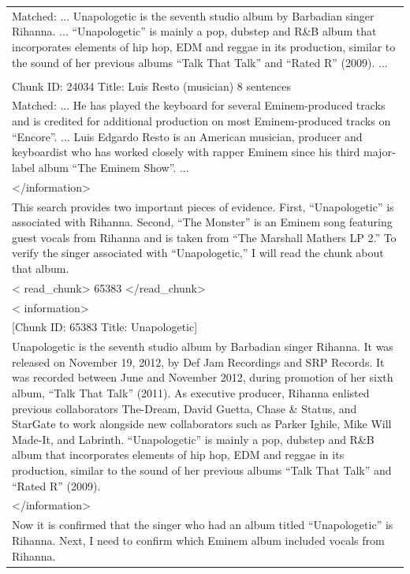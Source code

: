\documentclass[11pt]{article}
\begin{document}
\begin{longtable}{|p{}|}
Matched: ... Unapologetic is the seventh studio album by Barbadian singer Rihanna. ... ``Unapologetic'' is mainly a pop, dubstep and R\&B album that incorporates elements of hip hop, EDM and reggae in its production, similar to the sound of her previous albums ``Talk That Talk'' and ``Rated R'' (2009). ... \\
\\
Chunk ID: 24034 \textbar{} Title: Luis Resto (musician) \textbar{} 8 sentences \\
Matched: ... He has played the keyboard for several Eminem-produced tracks and is credited for additional production on most Eminem-produced tracks on ``Encore''. ... Luis Edgardo Resto is an American musician, producer and keyboardist who has worked closely with rapper Eminem since his third major-label album ``The Eminem Show''. ... \\
\textless{}/information\textgreater{} \\
\hline
This search provides two important pieces of evidence. First, ``Unapologetic'' is associated with Rihanna. Second, ``The Monster'' is an Eminem song featuring guest vocals from Rihanna and is taken from ``The Marshall Mathers LP 2.'' To verify the singer associated with ``Unapologetic,'' I will read the chunk about that album. \\
\hline
\textless{} read\_chunk\textgreater{} 65383 \textless{}/read\_chunk\textgreater{} \\
\hline
\textless{} information\textgreater{} \\
{[}Chunk ID: 65383 \textbar{} Title: Unapologetic{]} \\
Unapologetic is the seventh studio album by Barbadian singer Rihanna. It was released on November 19, 2012, by Def Jam Recordings and SRP Records. It was recorded between June and November 2012, during promotion of her sixth album, ``Talk That Talk'' (2011). As executive producer, Rihanna enlisted previous collaborators The-Dream, David Guetta, Chase \& Status, and StarGate to work alongside new collaborators such as Parker Ighile, Mike Will Made-It, and Labrinth. ``Unapologetic'' is mainly a pop, dubstep and R\&B album that incorporates elements of hip hop, EDM and reggae in its production, similar to the sound of her previous albums ``Talk That Talk'' and ``Rated R'' (2009). \\
\textless{}/information\textgreater{} \\
\hline
Now it is confirmed that the singer who had an album titled ``Unapologetic'' is Rihanna. Next, I need to confirm which Eminem album included vocals from Rihanna. \\

\end{longtable}
\end{document}

